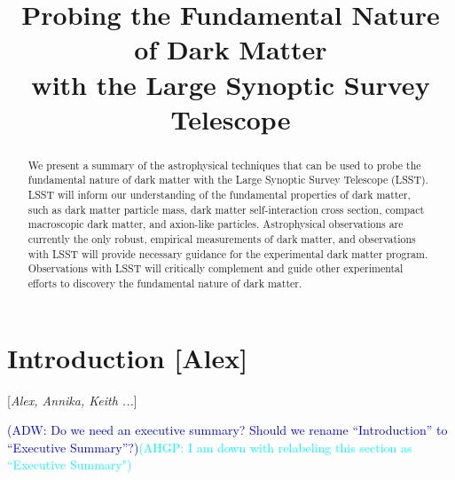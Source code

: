 \documentclass[modern,linenumbers]{aastex62}
\newcommand{\Contributors}[1]{ {\footnotesize [\textit{#1}]}}
\newcommand{\Contact}[1]{ {\footnotesize [\textbf{#1}]}}
\newcommand{\Comment}[3]{\textcolor{#1}{(#2: #3)}}
\newcommand{\ADW}[1]{\Comment{blue}{ADW}{#1}} %
\newcommand{\AHGP}[1]{\Comment{cyan}{AHGP}{#1}} %
\begin{document}
\title{\Large Probing the Fundamental Nature of Dark Matter \\
with the Large Synoptic Survey Telescope}


\begin{abstract}
We present a summary of the astrophysical techniques that can be used to probe the fundamental nature of dark matter with the Large Synoptic Survey Telescope (LSST). 
LSST will inform our understanding of the fundamental properties of dark matter, such as dark matter particle mass, dark matter self-interaction cross section, compact macroscopic dark matter, and axion-like particles.
Astrophysical observations are currently the only robust, empirical measurements of dark matter, and observations with LSST will provide necessary guidance for the experimental dark matter program.
Observations with LSST will critically complement and guide other experimental efforts to discovery the fundamental nature of dark matter.
\end{abstract}

\tableofcontents 



\section{Introduction \Contact{Alex}}
\Contributors{Alex, Annika, Keith ...}
\label{sec:intro}

\ADW{Do we need an executive summary? Should we rename ``Introduction'' to ``Executive Summary''?}\AHGP{I am down with relabeling this section as ``Executive Summary"}







\end{document}
